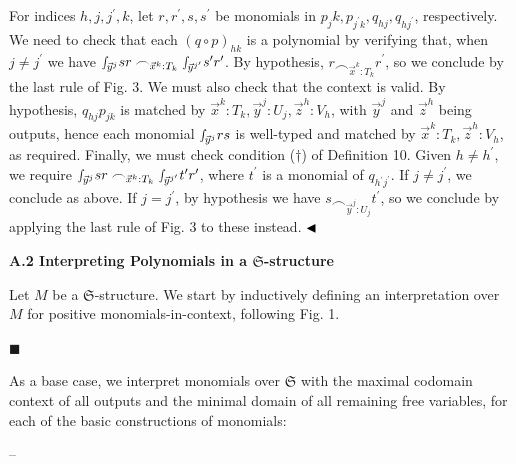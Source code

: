 \documentclass[10pt,a4paper]{amsart}
\begin{document}
For indices $h,j,j^{\prime},k$, let $r,r^{\prime},s,s^{\prime}$ be monomials in $p_{j}k,p_{j^{\prime}k},q_{hj},q_{hj^{\prime}}$, respectively. We need to check that each $(q\circ p)_{hk}$ is a polynomial by verifying that, when $j\neq j^{\prime}$ we have ${\smallint\!}_{\vec{y}^{j}}sr\frown_{\vec{x}^{k}:T_{k}}{\smallint\!}_{\vec{y}^%
{j^{\prime}}}s^{\prime}r^{\prime}$. By hypothesis, $r\frown_{\vec{x}^{k}:T_{k}}r^{\prime}$, so we conclude by the last rule of Fig. 3. We must also check that the context is valid. By hypothesis, $q_{hj}p_{jk}$ is matched by $\vec{x}^{k}:T_{k},\vec{y}^{j}:U_{j},\vec{z}^{h}:V_{h}$, with $\vec{y}^{j}$ and $\vec{z}^{h}$ being outputs, hence each monomial ${\smallint\!}_{\vec{y}^{j}}rs$ is well-typed and matched by $\vec{x}^{k}:T_{k},\vec{z}^{h}:V_{h}$, as required. Finally, we must check condition (${\dagger}$) of Definition 10. Given $h\neq h^{\prime}$, we require ${\smallint\!}_{\vec{y}^{j}}sr\frown_{\vec{x}^{k}:T_{k}}{\smallint\!}_{\vec{y}^%
{j^{\prime}}}t^{\prime}r^{\prime}$, where $t^{\prime}$ is a monomial of $q_{h^{\prime}j^{\prime}}$. If $j\neq j^{\prime}$, we conclude as above. If $j=j^{\prime}$, by hypothesis we have $s\frown_{\vec{y}^{j}:U_{j}}t^{\prime}$, so we conclude by applying the last rule of Fig. 3 to these instead. $\hfill\blacktriangleleft$\par
 
 
 


 
\par\medskip\noindent\textbf{A.2 Interpreting Polynomials in a $\mathfrak{S}$-structure}\par
 
 
Let $M$ be a $\mathfrak{S}$-structure. We start by inductively defining an interpretation over $M$ for positive monomials-in-context, following Fig. 1.\par
  
\par\noindent  $\blacksquare$ 
 
As a base case, we interpret monomials over $\mathfrak{S}$ with the maximal codomain context of all outputs and the minimal domain of all remaining free variables, for each of the basic constructions of monomials:\par
  
\par\noindent  – 
 
\end{document}
